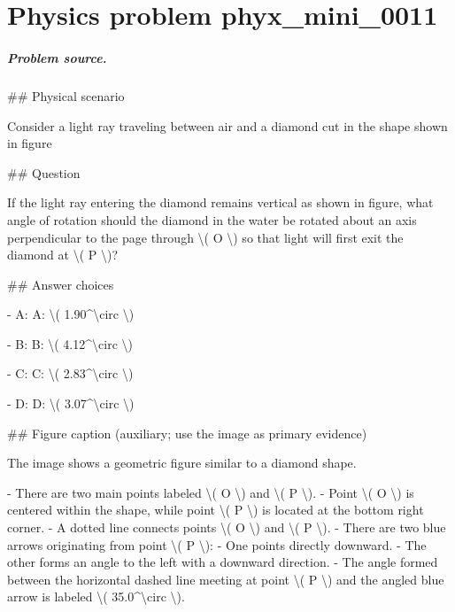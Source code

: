 
\chapter{Physics problem phyx\_mini\_0011}
\label{ch:PhyXMiniProblems_problem_phyx_mini_0011}

\paragraph{Problem source.}
\#\# Physical scenario

Consider a light ray traveling between air and a diamond cut in the shape shown in figure

\#\# Question

If the light ray entering the diamond remains vertical as shown in figure, what angle of rotation should the diamond in the water be rotated about an axis perpendicular to the page through \textbackslash{}( O \textbackslash{}) so that light will first exit the diamond at \textbackslash{}( P \textbackslash{})?

\#\# Answer choices

- A: A: \textbackslash{}( 1.90\textasciicircum{}\textbackslash{}circ \textbackslash{})

- B: B: \textbackslash{}( 4.12\textasciicircum{}\textbackslash{}circ \textbackslash{})

- C: C: \textbackslash{}( 2.83\textasciicircum{}\textbackslash{}circ \textbackslash{})

- D: D: \textbackslash{}( 3.07\textasciicircum{}\textbackslash{}circ \textbackslash{})

\#\# Figure caption (auxiliary; use the image as primary evidence)

The image shows a geometric figure similar to a diamond shape. 

- There are two main points labeled \textbackslash{}( O \textbackslash{}) and \textbackslash{}( P \textbackslash{}). 
- Point \textbackslash{}( O \textbackslash{}) is centered within the shape, while point \textbackslash{}( P \textbackslash{}) is located at the bottom right corner.
- A dotted line connects points \textbackslash{}( O \textbackslash{}) and \textbackslash{}( P \textbackslash{}).
- There are two blue arrows originating from point \textbackslash{}( P \textbackslash{}): 
  - One points directly downward.
  - The other forms an angle to the left with a downward direction.
- The angle formed between the horizontal dashed line meeting at point \textbackslash{}( P \textbackslash{}) and the angled blue arrow is labeled \textbackslash{}( 35.0\textasciicircum{}\textbackslash{}circ \textbackslash{}).

